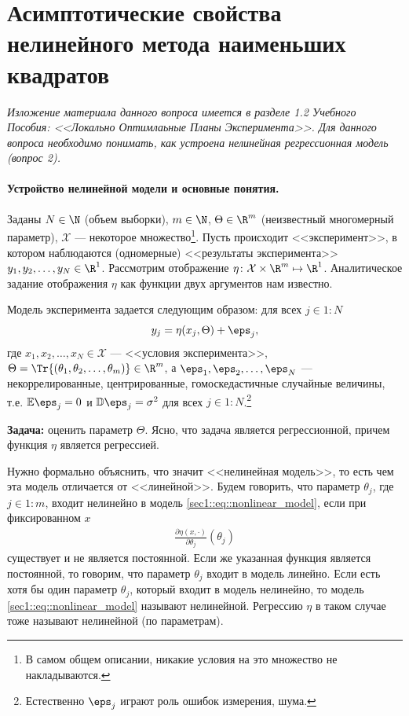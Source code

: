 \section{Асимптотические свойства нелинейного метода наименьших квадратов}

\textit{Изложение материала данного вопроса имеется в разделе 1.2 Учебного Пособия: <<Локально Оптимлаьные Планы Эксперимента>>.
        Для данного вопроса необходимо понимать, как устроена нелинейная регрессионная модель (вопрос 2).}

\paragraph{Устройство нелинейной модели и основные понятия.}
Заданы $N \in \N$ (объем выборки), $m \in \N$, $\Theta \in \R^m$ (неизвестный многомерный параметр), $\mathcal X$ --- некоторое множество\footnote{
    В самом общем описании, никакие условия на это множество не накладываются.
}.
Пусть происходит <<эксперимент>>, в котором наблюдаются (одномерные) <<результаты эксперимента>> $y_1, y_2, \ldots, y_N \in \R^1$.
Рассмотрим отображение $\eta \colon \mathcal X \times \R^m \mapsto \R^1$.
Аналитическое задание отображения $\eta$ как функции двух аргументов нам известно.

Модель эксперимента задается следующим образом: для всех $j \in 1:N$
\begin{gather}
    \label{sec1::eq::nonlinear_model}
    y_j = \eta(x_j, \Theta) + \eps_j,
\end{gather}
где $x_1, x_2, \ldots, x_N \in \mathcal X$ --- <<условия эксперимента>>, $\Theta = \Tr{(\theta_1, \theta_2, \ldots, \theta_m)} \in \R^m$,
а $\eps_1, \eps_2, \ldots, \eps_N$ --- некоррелированные, центрированные, гомоскедастичные случайные величины, т.е.
$\mathbb E \eps_j = 0$ и $\mathbb D \eps_j = \sigma^2$ для всех $j \in 1:N$.\footnote{Естественно $\eps_j$ играют роль ошибок измерения, шума.}

\textbf{Задача:} оценить параметр $\Theta$.
Ясно, что задача является регрессионной, причем функция $\eta$ является регрессией.

Нужно формально объяснить, что значит <<нелинейная модель>>, то есть чем эта модель отличается от <<линейной>>.
Будем говорить, что параметр $\theta_j$, где $j \in 1:m$, входит нелинейно в модель \eqref{sec1::eq::nonlinear_model},
если при фиксированном $x$
\begin{gather*}
    \frac{\partial \eta(x, \cdot)}{\partial \theta_j}(\theta_j)
\end{gather*}
существует и не является постоянной. Если же указанная функция является постоянной, то говорим, что параметр $\theta_j$ входит в модель линейно.
Если есть хотя бы один параметр $\theta_j$, который входит в модель нелинейно, то модель \eqref{sec1::eq::nonlinear_model} называют нелинейной.
Регрессию $\eta$ в таком случае тоже называют нелинейной (по параметрам).

